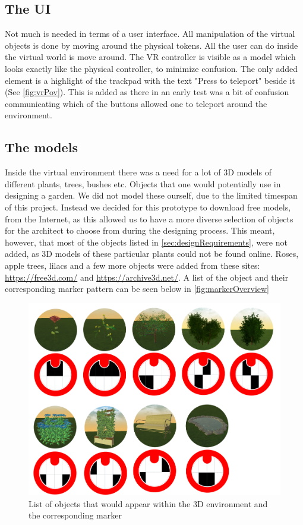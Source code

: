 \subsection{The UI}
\label{sec:designUI}
Not much is needed in terms of a user interface. All manipulation of the virtual objects is done by moving around the physical tokens. All the user can do inside the virtual world is move around. The VR controller is visible as a model which looks exactly like the physical controller, to minimize confusion. The only added element is a highlight of the trackpad with the text "Press to teleport" beside it (See \autoref{fig:vrPov}). This is added as there in an early test was a bit of confusion communicating which of the buttons allowed one to teleport around the environment.

\subsection{The models}
\label{sec:tokentop}
Inside the virtual environment there was a need for a lot of 3D models of different plants, trees, bushes etc. Objects that one would potentially use in designing a garden. We did not model these ourself, due to the limited timespan of this project. Instead we decided for this prototype to download free models, from the Internet, as this allowed us to have a more diverse selection of objects for the architect to choose from during the designing process. This meant, however, that most of the objects listed in \autoref{sec:designRequirements}, were not added, as 3D models of these particular plants could not be found online. Roses, apple trees, lilacs and a few more objects were added from these sites: \url{https://free3d.com/} and \url{https://archive3d.net/}. A list of the object and their corresponding marker pattern can be seen below in \autoref{fig:markerOverview}

\begin{figure}[H]
	\centering
	\includegraphics[width=0.9\linewidth]{figure/Appendices/markersOverview.png}
	\caption{List of objects that would appear within the 3D environment and the corresponding marker}
	\label{fig:markerOverview}
\end{figure}








